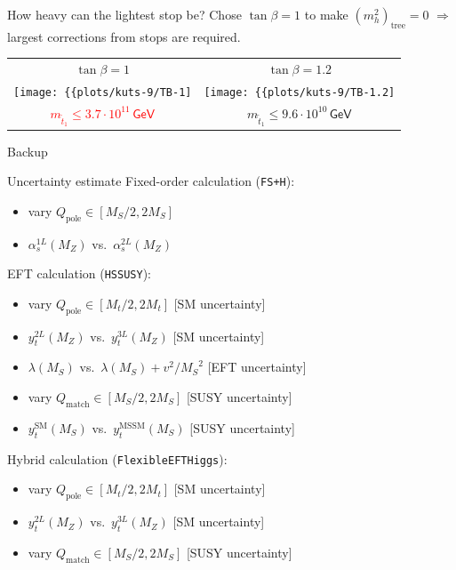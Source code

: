 \documentclass[hyperref={pdfpagelabels=false},ngerman]{beamer}
\newcommand{\eh}[1]{\,\mathsf{#1}}
\newcommand{\GeV}{\eh{GeV}}
\newcommand{\MS}{\ensuremath{M_S}}
\newcommand{\SM}{\ensuremath{\text{SM}}}
\newcommand{\MSSM}{\ensuremath{\text{MSSM}}}
\newcommand{\pole}{\ensuremath{\text{pole}}}
\newcommand{\match}{\ensuremath{\text{match}}}
\begin{document}
\begin{frame}{How heavy can the lightest stop be?}
  Chose $\tan\beta = 1$ to make $(m_h^2)_{\text{tree}} = 0$
  $\Rightarrow$ largest corrections from stops are required.
  \\[1em]
  \begin{center}
    \begin{tabular}{cc}
      $\tan\beta = 1$ & $\tan\beta = 1.2$ \\
      \texttt{[image: \{\{plots/kuts-9/TB-1]}}} &
      \texttt{[image: \{\{plots/kuts-9/TB-1.2]}}} \\
      \textcolor{red}{$m_{\tilde{t}_1} \leq 3.7\cdot 10^{11}\GeV$} &
      $m_{\tilde{t}_1} \leq 9.6\cdot 10^{10}\GeV$
    \end{tabular}
  \end{center}
\end{frame}

\begin{frame}[noframenumbering]
  \begin{center}
    \Huge Backup
  \end{center}
\end{frame}

\begin{frame}[noframenumbering]{Uncertainty estimate}
  Fixed-order calculation (\texttt{FS+H}):
  \begin{itemize}
  \item vary $Q_\pole \in [\MS/2, 2\MS]$
  \item $\alpha^{1L}_s(M_Z)$ vs.\ $\alpha^{2L}_s(M_Z)$
  \end{itemize}
  EFT calculation (\texttt{HSSUSY}):
  \begin{itemize}
  \item vary $Q_\pole \in [M_t/2, 2 M_t]$ \hfill [SM uncertainty]
  \item $y_t^{2L}(M_Z)$ vs.\ $y_t^{3L}(M_Z)$ \hfill [SM uncertainty]
  \item $\lambda(\MS)$ vs.\ $\lambda(\MS) + v^2/\MS^2$ \hfill [EFT uncertainty]
  \item vary $Q_\match \in [\MS/2, 2 \MS]$ \hfill [SUSY uncertainty]
  \item $y_t^{\SM}(\MS)$ vs.\ $y_t^{\MSSM}(\MS)$ \hfill [SUSY uncertainty]
  \end{itemize}
  Hybrid calculation (\texttt{FlexibleEFTHiggs}):
  \begin{itemize}
  \item vary $Q_\pole \in [M_t/2, 2 M_t]$ \hfill [SM uncertainty]
  \item $y_t^{2L}(M_Z)$ vs.\ $y_t^{3L}(M_Z)$ \hfill [SM uncertainty]
  \item vary $Q_\match \in [\MS/2, 2 \MS]$ \hfill [SUSY uncertainty]
  \end{itemize}
\end{frame}
\end{document}

